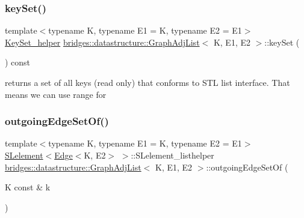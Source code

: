 \subsubsection{\texorpdfstring{keySet()}{keySet()}}
{\footnotesize\ttfamily template$<$typename K, typename E1 = K, typename E2 = E1$>$ \\
\mbox{\hyperlink{classbridges_1_1datastructure_1_1_graph_adj_list_1_1_key_set__helper}{Key\+Set\+\_\+helper}} \mbox{\hyperlink{classbridges_1_1datastructure_1_1_graph_adj_list}{bridges\+::datastructure\+::\+Graph\+Adj\+List}}$<$ K, E1, E2 $>$\+::key\+Set (\begin{DoxyParamCaption}{ }\end{DoxyParamCaption}) const\hspace{0.3cm}{\ttfamily [inline]}}

returns a set of all keys (read only) that conforms to S\+TL list interface. That means we can use range for \mbox{\label{classbridges_1_1datastructure_1_1_graph_adj_list_ac066da800ab88dc2e55a89650e08bb78}} 
\subsubsection{\texorpdfstring{outgoingEdgeSetOf()}{outgoingEdgeSetOf()}\hspace{0.1cm}{\footnotesize\ttfamily [1/2]}}
{\footnotesize\ttfamily template$<$typename K, typename E1 = K, typename E2 = E1$>$ \\
\mbox{\hyperlink{classbridges_1_1datastructure_1_1_s_lelement}{S\+Lelement}}$<$\mbox{\hyperlink{classbridges_1_1datastructure_1_1_edge}{Edge}}$<$K, E2$>$ $>$\+::S\+Lelement\+\_\+listhelper \mbox{\hyperlink{classbridges_1_1datastructure_1_1_graph_adj_list}{bridges\+::datastructure\+::\+Graph\+Adj\+List}}$<$ K, E1, E2 $>$\+::outgoing\+Edge\+Set\+Of (\begin{DoxyParamCaption}\item[{K const \&}]{k }\end{DoxyParamCaption})\hspace{0.3cm}{\ttfamily [inline]}}

\mbox{\label{classbridges_1_1datastructure_1_1_graph_adj_list_ab0677da029442194925f8167cc2b8638}} 
